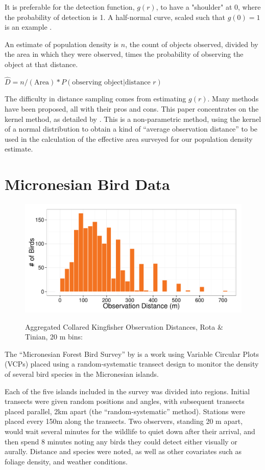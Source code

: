 \documentclass[12pt]{article}
\begin{document}
It is preferable for the detection function, $g(r)$, to have a "shoulder" at 0, where the probability of detection is 1. A half-normal curve, scaled such that $g(0)=1$ is an example \parencite{buckland2001}.

An estimate of population density is $n$, the count of objects observed, divided by the area in which they were observed, times the probability of observing the object at that distance. \cite{buckland2001} %

$\hat{D}=n/(\mbox{Area})*P(\mbox{observing object}|\mbox{distance }r)$

The difficulty in distance sampling comes from estimating $g(r)$. Many methods have been proposed, all with their pros and cons. This paper concentrates on the kernel method, as detailed by \textcite{quang1993}. This is a non-parametric method, using the kernel of a normal distribution to obtain a kind of ``average observation distance'' to be used in the calculation of the effective area surveyed for our population density estimate.

\section{Micronesian Bird Data}
\begin{figure}
	\caption{Aggregated Collared Kingfisher Observation Distances, Rota \& Tinian, 20 m bins: \cite{micronesian}}
	\includegraphics[width=\textwidth]{../images/histogram_dist_20m.pdf}
	\label{fig:82dist}
\end{figure}
The ``Micronesian Forest Bird Survey'' by \textcite{micronesian} is a work using Variable Circular Plots (VCPs) placed using a random-systematic transect design to monitor the density of several bird species in the Micronesian islands.

Each of the five islands included in the survey was divided into regions. Initial transects were given random positions and angles, with subsequent transects placed parallel, 2km apart (the ``random-systematic'' method). Stations were placed every 150m along the transects. Two observers, standing 20 m apart, would wait several minutes for the wildlife to quiet down after their arrival, and then spend 8 minutes noting any birds they could detect either visually or aurally. Distance and species were noted, as well as other covariates such as foliage density, and weather conditions. 
\end{document}
